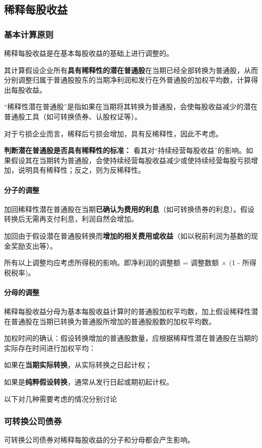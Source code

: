 \documentclass[UTF8,12pt]{ctexart}
\numberwithin{equation}{section} %
\numberwithin{figure}{section}
\numberwithin{table}{section}
\begin{document}
	
	\subsection{稀释每股收益}
	\subsubsection{基本计算原则}
	稀释每股收益是在基本每股收益的基础上进行调整的。
	
	其计算假设企业所有\textbf{具有稀释性的潜在普通股}在当期已经全部转换为普通股，从而分别调整归属于普通股股东的当期净利润和发行在外普通股的加权平均数，计算得出每股收益。
	
	“稀释性潜在普通股”是指如果在当期将其转换为普通股，会使每股收益减少的潜在普通股工具（如可转换债券、认股权证等）。
	
	对于亏损企业而言，稀释后亏损会增加，具有反稀释性，因此不考虑。
	
	
	\textbf{判断潜在普通股是否具有稀释性的标准：}
	看其对“持续经营每股收益”的影响。如果假设其在当期转为普通股，会使持续经营每股收益减少或使持续经营每股亏损增加，说明具有稀释性；反之，则为反稀释性。
	
	\paragraph{分子的调整}	
	加回稀释性潜在普通股在当期\textbf{已确认为费用的利息}（如可转换债券的利息）。假设转换后无需再支付利息，利润自然会增加。
	
	加回由于假设潜在普通股转换而\textbf{增加的相关费用或收益}（如以税前利润为基数的现金奖励支出等）。
	
	所有以上调整均应考虑所得税的影响。即净利润的调整额 = 调整数额 × (1 - 所得税税率)。
	
	\paragraph{分母的调整}
	稀释每股收益分母为基本每股收益计算时的普通股加权平均数，加上假设稀释性潜在普通股在当期已转换为普通股所增加的普通股股数的加权平均数。
	
	加权时间的确认：假设转换增加的普通股数量，应根据稀释性潜在普通股在当期的实际存在时间进行加权平均：
	
	如果在\textbf{当期实际转换}，从实际转换之日起计权；
	
	如果是\textbf{纯粹假设转换}，通常从发行日起或期初起计权。


	以下对几种需要考虑的情况分别讨论
	\subsubsection{可转换公司债券}
	可转换公司债券对稀释每股收益的分子和分母都会产生影响。
	
\end{document}
